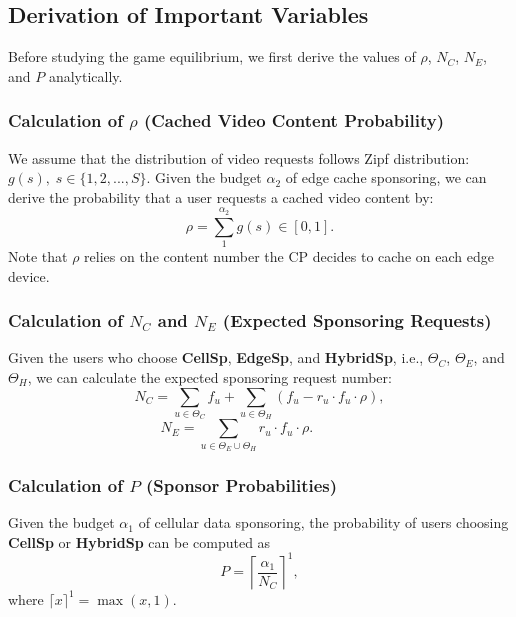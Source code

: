 \subsection{Derivation of Important Variables}\label{sec:variables}
	Before studying the game equilibrium, we first derive the values of $\rho$, $N_C$, $N_E$, and $P$ analytically.
	
\subsubsection{\textbf{Calculation of $\rho$} (Cached Video Content Probability)}
 	We assume that the distribution of video requests follows Zipf distribution: $g(s) ,\;s\in \{1,2,...,S\}$. Given the budget $\alpha_2$ of edge cache sponsoring, we can derive the probability that a user requests a cached video content by:
	\begin{equation}\rho= \sum_1^{\alpha_2}g(s)\in [0,1].\end{equation}
Note that $\rho$ relies on the content number the CP decides to cache on each edge device.

\subsubsection{\textbf{Calculation of $N_C$ and $N_E$} (Expected Sponsoring Requests)}
	Given the users who choose \textbf{CellSp}, \textbf{EdgeSp}, and \textbf{HybridSp}, i.e.,  $\Theta_C$, $\Theta_E$, and $\Theta_H$, we can calculate the expected sponsoring request number:
	\begin{equation}
N_C=\sum_{u \in \Theta_C}f_u+\sum_{u \in \Theta_H}(f_u-r_u\cdot f_u\cdot\rho),\end{equation}
	\begin{equation}
N_E=\sum_{u \in \Theta_E\cup \Theta_H}r_u\cdot f_u\cdot\rho.~~~~~~~~~~~~~~~
\end{equation}

\subsubsection{\textbf{Calculation of $P$} (Sponsor Probabilities)}
	Given the budget $\alpha_1$ of cellular data sponsoring, the probability of users choosing \textbf{CellSp} or \textbf{HybridSp} can be computed as \begin{equation}P= \left\lceil \frac{\alpha_1}{N_C} \right\rceil^1,\end{equation}
where $\lceil x\rceil^1=\max(x,1)$.

